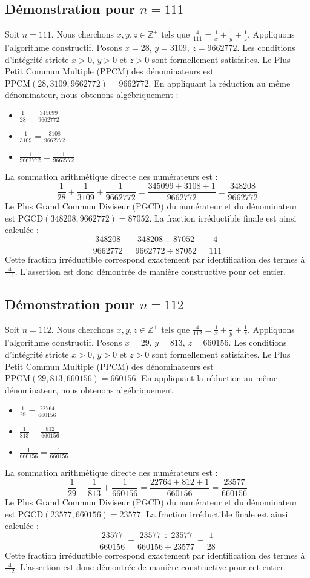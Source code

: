 \documentclass[11pt,a4paper]{article}
\begin{document}
\subsection{Démonstration pour $n = 111$}
Soit $n = 111$. Nous cherchons $x, y, z \in \mathbb{Z}^{+}$ tels que $\frac{4}{111} = \frac{1}{x} + \frac{1}{y} + \frac{1}{z}$.
Appliquons l'algorithme constructif. Posons $x = 28$, $y = 3109$, $z = 9662772$.
Les conditions d'intégrité stricte $x > 0$, $y > 0$ et $z > 0$ sont formellement satisfaites.
Le Plus Petit Commun Multiple (PPCM) des dénominateurs est $\text{PPCM}(28, 3109, 9662772) = 9662772$.
En appliquant la réduction au même dénominateur, nous obtenons algébriquement :
\begin{itemize}
    \item $\frac{1}{28} = \frac{345099}{9662772}$
    \item $\frac{1}{3109} = \frac{3108}{9662772}$
    \item $\frac{1}{9662772} = \frac{1}{9662772}$
\end{itemize}
La sommation arithmétique directe des numérateurs est :
$$ \frac{1}{28} + \frac{1}{3109} + \frac{1}{9662772} = \frac{345099 + 3108 + 1}{9662772} = \frac{348208}{9662772} $$
Le Plus Grand Commun Diviseur (PGCD) du numérateur et du dénominateur est $\text{PGCD}(348208, 9662772) = 87052$.
La fraction irréductible finale est ainsi calculée :
$$ \frac{348208}{9662772} = \frac{348208 \div 87052}{9662772 \div 87052} = \frac{4}{111} $$
Cette fraction irréductible correspond exactement par identification des termes à $\frac{4}{111}$. L'assertion est donc démontrée de manière constructive pour cet entier.

\subsection{Démonstration pour $n = 112$}
Soit $n = 112$. Nous cherchons $x, y, z \in \mathbb{Z}^{+}$ tels que $\frac{4}{112} = \frac{1}{x} + \frac{1}{y} + \frac{1}{z}$.
Appliquons l'algorithme constructif. Posons $x = 29$, $y = 813$, $z = 660156$.
Les conditions d'intégrité stricte $x > 0$, $y > 0$ et $z > 0$ sont formellement satisfaites.
Le Plus Petit Commun Multiple (PPCM) des dénominateurs est $\text{PPCM}(29, 813, 660156) = 660156$.
En appliquant la réduction au même dénominateur, nous obtenons algébriquement :
\begin{itemize}
    \item $\frac{1}{29} = \frac{22764}{660156}$
    \item $\frac{1}{813} = \frac{812}{660156}$
    \item $\frac{1}{660156} = \frac{1}{660156}$
\end{itemize}
La sommation arithmétique directe des numérateurs est :
$$ \frac{1}{29} + \frac{1}{813} + \frac{1}{660156} = \frac{22764 + 812 + 1}{660156} = \frac{23577}{660156} $$
Le Plus Grand Commun Diviseur (PGCD) du numérateur et du dénominateur est $\text{PGCD}(23577, 660156) = 23577$.
La fraction irréductible finale est ainsi calculée :
$$ \frac{23577}{660156} = \frac{23577 \div 23577}{660156 \div 23577} = \frac{1}{28} $$
Cette fraction irréductible correspond exactement par identification des termes à $\frac{4}{112}$. L'assertion est donc démontrée de manière constructive pour cet entier.
\end{document}
